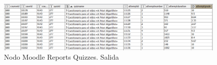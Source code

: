 \begin{figure}[!h]
	\centering
	\includegraphics[width=1\textwidth]{img/nodes_moodle_reports_quizzes_output.png}
	\caption{Nodo Moodle Reports Quizzes. Salida}
	\label{fig:moodlereportsquizzes_output}
\end{figure}
\FloatBarrier
\hphantom{ }


